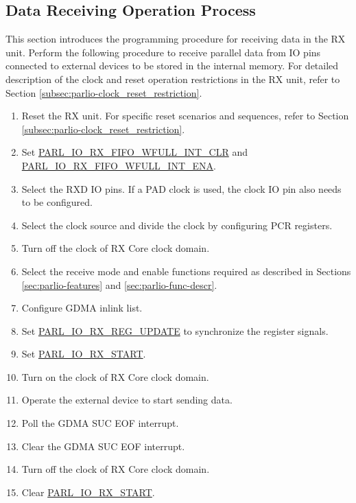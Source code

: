 \documentclass[main\_\_EN.tex]{subfiles}
\begin{document}
\subsection{Data Receiving Operation Process}

This section introduces the programming procedure for receiving data in the RX unit. Perform the following procedure to receive parallel data from IO pins connected to external devices to be stored in the internal memory. For detailed description of the clock and reset operation restrictions in the RX unit, refer to Section \ref{subsec:parlio-clock_reset_restriction}.
\begin{enumerate}
    \item Reset the RX unit. For specific reset scenarios and sequences, refer to Section \ref{subsec:parlio-clock_reset_restriction}.
    \item Set \hyperref[fielddesc:PARLIORXFIFOWFULLINTCLR]{PARL\_IO\_RX\_FIFO\_WFULL\_INT\_CLR} and \hyperref[fielddesc:PARLIORXFIFOWFULLINTENA]{PARL\_IO\_RX\_FIFO\_WFULL\_INT\_ENA}.
    \item Select the RXD IO pins. If a PAD clock is used, the clock IO pin also needs to be configured. 
    \item Select the clock source and divide the clock by configuring PCR registers.
    \item Turn off the clock of RX Core clock domain.
    \item Select the receive mode and enable functions required as described in Sections \ref{sec:parlio-features} and \ref{sec:parlio-func-descr}.
    \item Configure GDMA inlink list.
    \item Set \hyperref[fielddesc:PARLIORXREGUPDATE]{PARL\_IO\_RX\_REG\_UPDATE} to synchronize the register signals.
    \item Set \hyperref[fielddesc:PARLIORXSTART]{PARL\_IO\_RX\_START}.
    \item Turn on the clock of RX Core clock domain.
    \item Operate the external device to start sending data.
    \item Poll the GDMA SUC EOF interrupt.
    \item Clear the GDMA SUC EOF interrupt.
    \item Turn off the clock of RX Core clock domain.
    \item Clear \hyperref[fielddesc:PARLIORXSTART]{PARL\_IO\_RX\_START}.
\end{enumerate}
\end{document}
